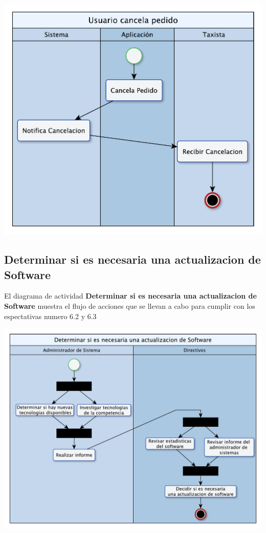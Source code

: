 \documentclass[a4paper]{article}
\begin{document}
\begin{center}
\includegraphics[scale=0.7]{DA_Cancela_Taxi.pdf}
\end{center}

\clearpage
\subsection{Determinar si es necesaria una actualizacion de Software}
El diagrama de actividad \textbf{Determinar si es necesaria una actualizacion de Software} muestra el flujo de acciones que se llevan a cabo
para cumplir con los espectativas numero 6.2 y 6.3

\begin{center}
\includegraphics[scale=0.7]{DA_Actualizacion_Soft.pdf}
\end{center}
\end{document}
